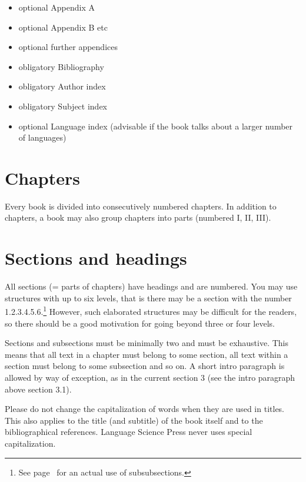 \begin{itemize}
 \item optional Appendix A
 \item optional Appendix B etc
 \item optional further appendices
 \item obligatory Bibliography
 \item obligatory Author index
 \item obligatory Subject index
 \item optional Language index (advisable if the book talks about a larger number of languages)
 
\end{itemize}


\section{Chapters}

Every book is divided into consecutively numbered chapters. In addition to chapters, a book may also
group chapters into parts (numbered I, II, III). %




\section{Sections and headings}

All sections (= parts of chapters) have headings and are numbered. You may use structures with up to
six levels, that is there may be a section with the number 1.2.3.4.5.6.\footnote{
  See page~\pageref{sec-Chinese} for an actual use of subsubsections.%
} However, such elaborated
structures may be difficult for the readers, so there should be a good motivation for going beyond
three or four levels.

Sections and subsections must be minimally two and must be exhaustive. This means that all text in a chapter
must belong to some section, all text within a section must belong to some subsection and so on. A
short intro paragraph is allowed by way of exception, as in the current section 3 (see the intro
paragraph above section 3.1).

Please do not change the capitalization of words when they are used in titles. 
This also applies
to the title (and subtitle) of the book itself and to the bibliographical references. Language
Science Press never uses special capitalization.

